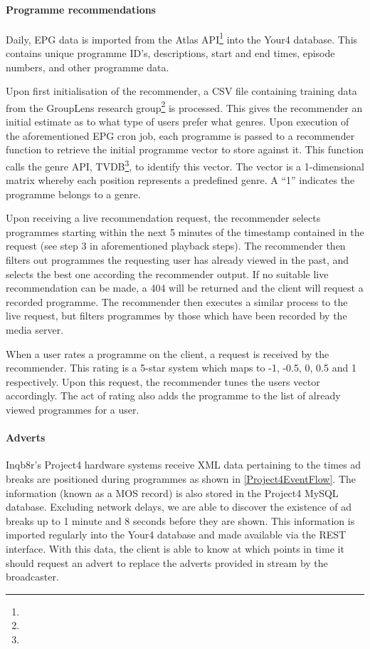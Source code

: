 \paragraph{Programme recommendations}

Daily, EPG data is imported from the Atlas API\footnote{} into the Your4 database. This contains unique programme ID's, descriptions, start and end times, episode numbers, and other programme data.

Upon first initialisation of the recommender, a CSV file containing training data from the GroupLens research group\footnote{} is processed. This gives the recommender an initial estimate as to what type of users prefer what genres. Upon execution of the aforementioned EPG cron job, each programme is passed to a recommender function to retrieve the initial programme vector to store against it. This function calls the genre API, TVDB\footnote{}, to identify this vector. The vector is a 1-dimensional matrix whereby each position represents a predefined genre. A ``1'' indicates the programme belongs to a genre.

Upon receiving a live recommendation request, the recommender selects programmes starting within the next 5 minutes of the timestamp contained in the request (see step 3 in aforementioned playback steps). The recommender then filters out programmes the requesting user has already viewed in the past, and selects the best one according the recommender output. If no suitable live recommendation can be made, a 404 will be returned and the client will request a recorded programme. The recommender then executes a similar process to the live request, but filters programmes by those which have been recorded by the media server.

When a user rates a programme on the client, a request is received by the recommender. This rating is a 5-star system which maps to -1, -0.5, 0, 0.5 and 1 respectively. Upon this request, the recommender tunes the users vector accordingly. The act of rating also adds the programme to the list of already viewed programmes for a user.

\paragraph{Adverts}

Inqb8r's Project4 hardware systems receive XML data pertaining to the times ad breaks are positioned during programmes as shown in \ref{Project4EventFlow}. The information (known as a MOS record) is also stored in the Project4 MySQL database. Excluding network delays, we are able to discover the existence of ad breaks up to 1 minute and 8 seconds before they are shown. This information is imported regularly into the Your4 database and made available via the REST interface. With this data, the client is able to know at which points in time it should request an advert to replace the adverts provided in stream by the broadcaster.

